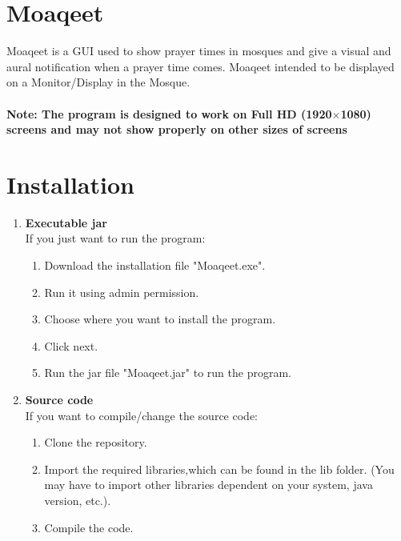 \documentclass[12pt,a4paper]{article}
\begin{document}
\section*{Moaqeet}
Moaqeet is a GUI used to show prayer times in mosques and give a visual and aural notification when a prayer time comes. Moaqeet intended to be displayed on a Monitor/Display in the Mosque.\\\\
 \textbf{Note: The program is designed to work on Full HD (1920$\times$1080) screens and may not show properly on other sizes of screens}

\section*{Installation}
\begin{enumerate}
\item \textbf{Executable jar}\\
If you just want to run the program:
\begin{enumerate}
\item Download the installation file "Moaqeet.exe". 
\item Run it using admin permission. 
\item Choose where you want to install the program.
\item Click next.
\item Run the jar file "Moaqeet.jar" to run the program.
\end{enumerate}
\item \textbf{Source code}\\
If you want to compile/change the source code:
\begin{enumerate}
\item Clone the repository. 
\item Import the required libraries,which can be found in the lib folder. (You may have to import other libraries dependent on your system, java version, etc.).
\item Compile the code.
\end{enumerate}
\end{enumerate}
\end{document}
